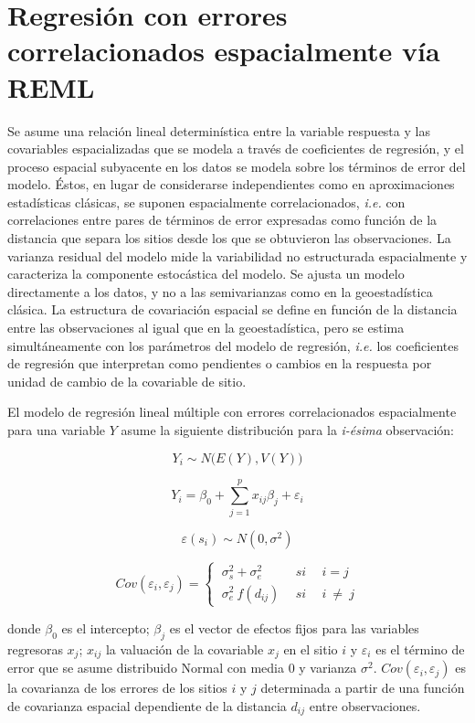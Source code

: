 \documentclass[11pt,b5paper,]{krantz}
\begin{document}
\hypertarget{regresiuxf3n-con-errores-correlacionados-espacialmente-vuxeda-reml}{%
\section{Regresión con errores correlacionados espacialmente vía REML}\label{regresiuxf3n-con-errores-correlacionados-espacialmente-vuxeda-reml}}

Se asume una relación lineal determinística entre la variable respuesta y las covariables espacializadas que se modela a través de coeficientes de regresión, y el proceso espacial subyacente en los datos se modela sobre los términos de error del modelo. Éstos, en lugar de considerarse independientes como en aproximaciones estadísticas clásicas, se suponen espacialmente correlacionados, \emph{i.e.} con correlaciones entre pares de términos de error expresadas como función de la distancia que separa los sitios desde los que se obtuvieron las observaciones. La varianza residual del modelo mide la variabilidad no estructurada espacialmente y caracteriza la componente estocástica del modelo. Se ajusta un modelo directamente a los datos, y no a las semivarianzas como en la geoestadística clásica. La estructura de covariación espacial se define en función de la distancia entre las observaciones al igual que en la geoestadística, pero se estima simultáneamente con los parámetros del modelo de regresión, \emph{i.e.} los coeficientes de regresión que interpretan como pendientes o cambios en la respuesta por unidad de cambio de la covariable de sitio.

El modelo de regresión lineal múltiple con errores correlacionados espacialmente para una variable \(Y\) asume la siguiente distribución para la \emph{i-ésima} observación:

\[Y_i\sim N \big(E(Y),V(Y) \big)\]

\[Y_i=\beta_0+\sum_{j=1}^{p}{x_{ij}\beta_j}+\varepsilon_i\]

\[\varepsilon(s_i)\sim N(0,\sigma^2)\]

\[Cov(\varepsilon_i,\varepsilon_j)=\left\{\ \begin{array}{lcc}
\sigma_s^2+\sigma_e^2\ &\ si\ &\ i=j
\\\sigma_e^2\ f(d_{ij})\ &\ si\ &\ i\ \neq\ j
\end{array}
\right.\]

donde \(\beta_0\) es el intercepto; \(\beta_j\) es el vector de efectos fijos para las variables regresoras \(x_j\); \(x_{ij}\) la valuación de la covariable \(x_j\) en el sitio \(i\) y \(\varepsilon_i\) es el término de error que se asume distribuido Normal con media 0 y varianza \(\sigma^2\). \(Cov(\varepsilon_i,\varepsilon_j)\) es la covarianza de los errores de los sitios \(i\) y \(j\) determinada a partir de una función de covarianza espacial dependiente de la distancia \(d_{ij}\) entre observaciones.
\end{document}
